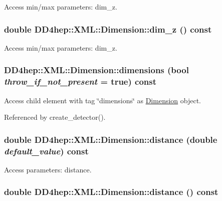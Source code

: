 Access min/max parameters: dim\_\-z. \hypertarget{struct_d_d4hep_1_1_x_m_l_1_1_dimension_a9d04b0cbb942808effc7245440d3df2f}{
\subsubsection[{dim\_\-z}]{\setlength{\rightskip}{0pt plus 5cm}double DD4hep::XML::Dimension::dim\_\-z () const}}
\label{struct_d_d4hep_1_1_x_m_l_1_1_dimension_a9d04b0cbb942808effc7245440d3df2f}


Access min/max parameters: dim\_\-z. \hypertarget{struct_d_d4hep_1_1_x_m_l_1_1_dimension_a97c17e031c8a055375bcf59a5119a2cb}{
\subsubsection[{dimensions}]{ DD4hep::XML::Dimension::dimensions (bool {\em throw\_\-if\_\-not\_\-present} = {\ttfamily true}) const}}
\label{struct_d_d4hep_1_1_x_m_l_1_1_dimension_a97c17e031c8a055375bcf59a5119a2cb}


Access child element with tag \char`\"{}dimensions\char`\"{} as \hyperlink{struct_d_d4hep_1_1_x_m_l_1_1_dimension}{Dimension} object. 

Referenced by create\_\-detector().\hypertarget{struct_d_d4hep_1_1_x_m_l_1_1_dimension_a73d16bac34cb0394e793fb86b558fb65}{
\subsubsection[{distance}]{\setlength{\rightskip}{0pt plus 5cm}double DD4hep::XML::Dimension::distance (double {\em default\_\-value}) const}}
\label{struct_d_d4hep_1_1_x_m_l_1_1_dimension_a73d16bac34cb0394e793fb86b558fb65}


Access parameters: distance. \hypertarget{struct_d_d4hep_1_1_x_m_l_1_1_dimension_a992d80466c835c2896adf1aeedcecda2}{
\subsubsection[{distance}]{\setlength{\rightskip}{0pt plus 5cm}double DD4hep::XML::Dimension::distance () const}}
\label{struct_d_d4hep_1_1_x_m_l_1_1_dimension_a992d80466c835c2896adf1aeedcecda2}


